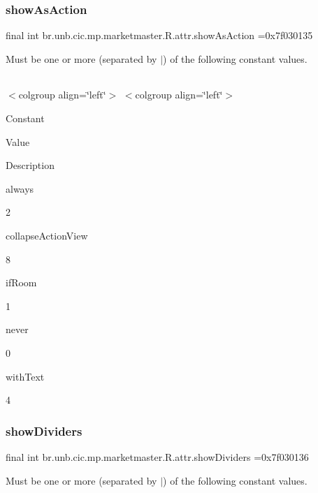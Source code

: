 \subsubsection{\texorpdfstring{show\+As\+Action}{showAsAction}}
{\footnotesize\ttfamily final int br.\+unb.\+cic.\+mp.\+marketmaster.\+R.\+attr.\+show\+As\+Action =0x7f030135\hspace{0.3cm}{\ttfamily [static]}}

Must be one or more (separated by \textquotesingle{}$\vert$\textquotesingle{}) of the following constant values.

\tabulinesep=1mm
\begin{longtabu} spread 0pt [c]{*{0}{|X[-1]}|}
\hline
\end{longtabu}
$<$colgroup align=\char`\"{}left\char`\"{}$>$ $<$colgroup align=\char`\"{}left\char`\"{}$>$ 

Constant

Value

Description 

always

2

collapse\+Action\+View

8

if\+Room

1

never

0

with\+Text

4\mbox{\label{classbr_1_1unb_1_1cic_1_1mp_1_1marketmaster_1_1R_1_1attr_a16f038586266f3505d334ad262bb3c91}} 
\subsubsection{\texorpdfstring{show\+Dividers}{showDividers}}
{\footnotesize\ttfamily final int br.\+unb.\+cic.\+mp.\+marketmaster.\+R.\+attr.\+show\+Dividers =0x7f030136\hspace{0.3cm}{\ttfamily [static]}}

Must be one or more (separated by \textquotesingle{}$\vert$\textquotesingle{}) of the following constant values.

